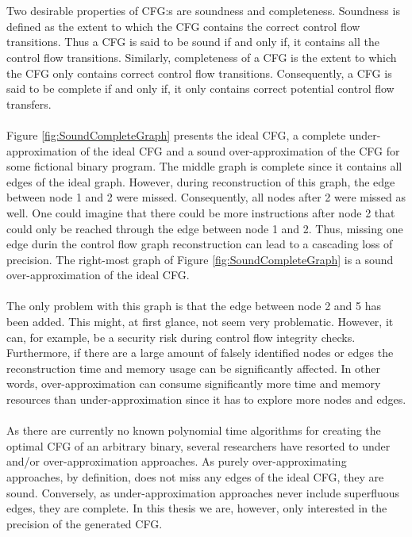 \documentclass{kththesis}
\begin{document}
\\ \\
Two desirable properties of CFG:s are soundness and completeness\cite{angr}. Soundness is defined as the extent to which the CFG contains the correct control flow transitions. Thus a CFG is said to be sound if and only if, it contains all the control flow transitions. Similarly, completeness of a CFG is the extent to which the CFG only contains correct control flow transitions. Consequently, a CFG is said to be complete if and only if, it only contains correct potential control flow transfers. 
\\ \\
Figure \ref{fig:SoundCompleteGraph} presents the ideal CFG, a complete under-approximation of the ideal CFG and a sound over-approximation of the CFG for some fictional binary program. The middle graph is complete since it contains all edges of the ideal graph. However, during reconstruction of this graph, the edge between node 1 and 2 were missed. Consequently, all nodes after 2 were missed as well. One could imagine that there could be more instructions after node 2 that could only be reached through the edge between node 1 and 2. Thus, missing one edge durin the control flow graph reconstruction can lead to a cascading loss of precision. 
The right-most graph of Figure \ref{fig:SoundCompleteGraph} is a sound over-approximation of the ideal CFG.
\\ \\
The only problem with this graph is that the edge between node 2 and 5 has been added. This might, at first glance, not seem very problematic. However, it can, for example, be a security risk during control flow integrity checks. Furthermore, if there are a large amount of falsely identified nodes or edges the reconstruction time and memory usage can be significantly affected. In other words, over-approximation can consume significantly more time and memory resources than under-approximation since it has to explore more nodes and edges\cite{alternating}.
\\ \\
As there are currently no known polynomial time algorithms for creating the optimal CFG of an arbitrary binary, several researchers have resorted to under and/or over-approximation approaches\cite{preciseCFGBoolean}\cite{preciseCFG}\cite{CFGFromPowerPC}\cite{angr}. As purely over-approximating approaches, by definition, does not miss any edges of the ideal CFG, they are sound. Conversely, as under-approximation approaches never include superfluous edges, they are complete. In this thesis we are, however, only interested in the precision of the generated CFG.
\end{document}
